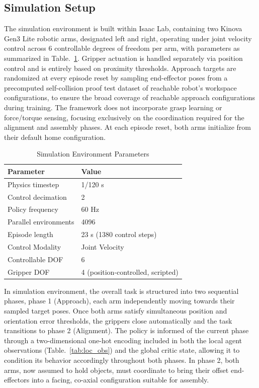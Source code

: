 \documentclass[lettersize,journal]{IEEEtran}
\begin{document}
\subsection{Simulation Setup}
\label{simulation_setup}
The simulation environment is built within Isaac Lab, containing two Kinova Gen3 Lite robotic arms, designated left and right, operating under joint velocity control across 6 controllable degrees of freedom per arm, with parameters as summarized in Table.~\ref{tab:hyperparams}. Gripper actuation is handled separately via position control and is entirely based on proximity thresholds. Approach targets are randomized at every episode reset by sampling end-effector poses from a precomputed self-collision proof test dataset of reachable robot's workspace configurations, to ensure the broad coverage of reachable approach configurations during training. The framework does not incorporate grasp learning or force/torque sensing, focusing exclusively on the coordination required for the alignment and assembly phases. At each episode reset, both arms initialize from their default home configuration.
\begin{table}[h]
\centering
\caption{Simulation Environment Parameters}
\begin{tabular}{ll}
\midrule 
\textbf{Parameter} & \textbf{Value} \\
\midrule \midrule
Physics timestep & 1/120 s \\
Control decimation & 2 \\
Policy frequency & 60 Hz \\
Parallel environments & 4096 \\
Episode length & 23 s (1380 control steps) \\
Control Modality & Joint Velocity \\
Controllable DOF & 6 \\
Gripper DOF & 4 (position-controlled, scripted) \\
\bottomrule
\end{tabular}
\label{tab:hyperparams}
\end{table}

In simulation environment, the overall task is structured into two sequential phases, phase 1 (Approach), each arm independently moving towards their sampled target poses. Once both arms satisfy simultaneous position and orientation error thresholds, the grippers close automatically and the task transitions to phase 2 (Alignment). The policy is informed of the current phase through a two-dimensional one-hot encoding included in both the local agent observations (Table.~\ref{tab:loc_obs}) and the global critic state, allowing it to condition its behavior accordingly throughout both phases. In phase 2, both arms, now assumed to hold objects, must coordinate to bring their offset end-effectors into a facing, co-axial configuration suitable for assembly. 
\end{document}
